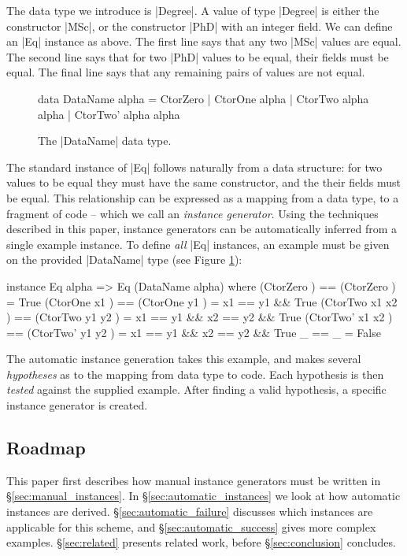 \documentclass{llncs}
\begin{document}
The data type we introduce is |Degree|. A value of type |Degree| is either the constructor |MSc|, or the constructor |PhD| with an integer field. We can define an |Eq| instance as above. The first line says that any two |MSc| values are equal. The second line says that for two |PhD| values to be equal, their fields must be equal. The final line says that any remaining pairs of values are not equal.

\begin{figure}
\begin{code}
data DataName alpha = CtorZero | CtorOne alpha | CtorTwo alpha alpha | CtorTwo' alpha alpha
\end{code}
\caption{The |DataName| data type.}
\label{fig:dataname}
\end{figure}

The standard instance of |Eq| follows naturally from a data structure: for two values to be equal they must have the same constructor, and the their fields must be equal. This relationship can be expressed as a mapping from a data type, to a fragment of code -- which we call an \textit{instance generator}. Using the techniques described in this paper, instance generators can be automatically inferred from a single example instance. To define \textit{all} |Eq| instances, an example must be given on the provided |DataName| type (see Figure \ref{fig:dataname}):

\begin{code}
instance Eq alpha => Eq (DataName alpha) where
    (CtorZero         )  == (CtorZero         )  = True
    (CtorOne   x1     )  == (CtorOne   y1     )  = x1 == y1 && True
    (CtorTwo   x1 x2  )  == (CtorTwo   y1 y2  )  = x1 == y1 && x2 == y2 && True
    (CtorTwo'  x1 x2  )  == (CtorTwo'  y1 y2  )  = x1 == y1 && x2 == y2 && True
    _                    == _                    = False
\end{code}

The automatic instance generation takes this example, and makes several \textit{hypotheses} as to the mapping from data type to code. Each hypothesis is then \textit{tested} against the supplied example. After finding a valid hypothesis, a specific instance generator is created.

\subsection{Roadmap}

This paper first describes how manual instance generators must be written in \S\ref{sec:manual_instances}. In \S\ref{sec:automatic_instances} we look at how automatic instances are derived. \S\ref{sec:automatic_failure} discusses which instances are applicable for this scheme, and \S\ref{sec:automatic_success} gives more complex examples. \S\ref{sec:related} presents related work, before \S\ref{sec:conclusion} concludes.
\end{document}
